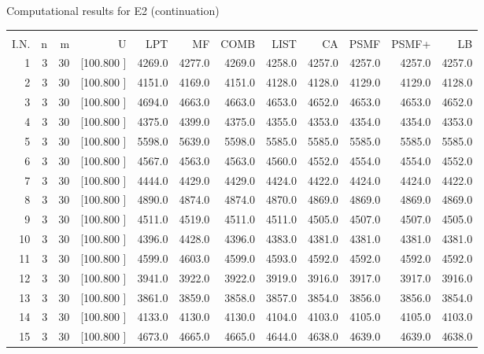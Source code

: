 \documentclass[12pt,a4paper]{article}
\begin{document}
\begin{center}
 Computational results for E2 (continuation) {\tiny
\begin{tabular}{r r r r r r r r r r r r}\hline
    &   &   &          &        &        &        &        &        &        &        &       \\[-0.1in]
  I.N.  &  n  &  m  &  U  &  LPT  &  MF  &  COMB  &  LIST  &  CA  & PSMF &PSMF+ & LB \\[0.03in]
\hline
   1&  3& 30&[100.800   ]&  4269.0&  4277.0&  4269.0&  4258.0&  4257.0&  4257.0&  4257.0&  4257.0\\[-0.02in]
   2&  3& 30&[100.800   ]&  4151.0&  4169.0&  4151.0&  4128.0&  4128.0&  4129.0&  4129.0&  4128.0\\[-0.02in]
   3&  3& 30&[100.800   ]&  4694.0&  4663.0&  4663.0&  4653.0&  4652.0&  4653.0&  4653.0&  4652.0\\[-0.02in]
   4&  3& 30&[100.800   ]&  4375.0&  4399.0&  4375.0&  4355.0&  4353.0&  4354.0&  4354.0&  4353.0\\[-0.02in]
   5&  3& 30&[100.800   ]&  5598.0&  5639.0&  5598.0&  5585.0&  5585.0&  5585.0&  5585.0&  5585.0\\[-0.02in]
   6&  3& 30&[100.800   ]&  4567.0&  4563.0&  4563.0&  4560.0&  4552.0&  4554.0&  4554.0&  4552.0\\[-0.02in]
   7&  3& 30&[100.800   ]&  4444.0&  4429.0&  4429.0&  4424.0&  4422.0&  4424.0&  4424.0&  4422.0\\[-0.02in]
   8&  3& 30&[100.800   ]&  4890.0&  4874.0&  4874.0&  4870.0&  4869.0&  4869.0&  4869.0&  4869.0\\[-0.02in]
   9&  3& 30&[100.800   ]&  4511.0&  4519.0&  4511.0&  4511.0&  4505.0&  4507.0&  4507.0&  4505.0\\[-0.02in]
  10&  3& 30&[100.800   ]&  4396.0&  4428.0&  4396.0&  4383.0&  4381.0&  4381.0&  4381.0&  4381.0\\[-0.02in]
  11&  3& 30&[100.800   ]&  4599.0&  4603.0&  4599.0&  4593.0&  4592.0&  4592.0&  4592.0&  4592.0\\[-0.02in]
  12&  3& 30&[100.800   ]&  3941.0&  3922.0&  3922.0&  3919.0&  3916.0&  3917.0&  3917.0&  3916.0\\[-0.02in]
  13&  3& 30&[100.800   ]&  3861.0&  3859.0&  3858.0&  3857.0&  3854.0&  3856.0&  3856.0&  3854.0\\[-0.02in]
  14&  3& 30&[100.800   ]&  4133.0&  4130.0&  4130.0&  4104.0&  4103.0&  4105.0&  4105.0&  4103.0\\[-0.02in]
  15&  3& 30&[100.800   ]&  4673.0&  4665.0&  4665.0&  4644.0&  4638.0&  4639.0&  4639.0&  4638.0\\[-0.02in]

\end{tabular}}
\end{center}
\end{document}
